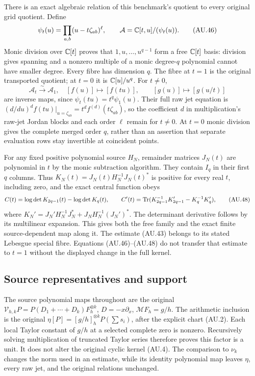 There is an exact algebraic relation of this benchmark's quotient to
every original grid quotient. Define
\[
 \psi_t(u)=\prod_{a,b}(u-t\zeta_{ab})^\ell,
 \qquad \mathcal A=\mathbb{C}[t,u]/(\psi_t(u)).                    \tag{AU.46}
\]
Monic division over $\mathbb{C}[t]$ proves that $1,u,\ldots,u^{q-1}$
form a free $\mathbb{C}[t]$ basis: division gives spanning and a nonzero
multiple of a monic degree-$q$ polynomial cannot have smaller degree.
Every fibre has dimension $q$. The fibre at $t=1$ is the original
transported quotient; at $t=0$ it is $\mathbb{C}[u]/u^q$. For $t\ne0$,
\[
 \mathcal A_t\xrightarrow{\sim}\mathcal A_1,
 \quad[f(u)]\longmapsto[f(tu)],\qquad
 [g(u)]\longmapsto[g(u/t)]                              \tag{AU.47}
\]
are inverse maps, since $\psi_t(tu)=t^q\psi_1(u)$.
Their full raw jet equation is
$(d/du)^d f(tu)|_{u=\zeta_{ab}}=t^df^{(d)}(t\zeta_{ab})$,
so the coefficient $d$ in multiplication's raw-jet Jordan blocks
and each order $\ell$ remain for $t\ne0$. At $t=0$ monic division
gives the complete merged order $q$, rather than an assertion that
separate evaluation rows stay invertible at coincident points.

For any fixed positive polynomial source $H_N$, remainder matrices
$J_N(t)$ are polynomial in $t$ by the monic subtraction algorithm.
They contain $I_q$ in their first $q$ columns. Thus
$K_N(t)=J_N(t)H_N^{-1}J_N(t)^*$ is positive for every real $t$,
including zero, and the exact central function obeys
\[
 C(t)=\log\det K_{2q-1}(t)-\log\det K_q(t),\qquad
 C'(t)=\operatorname{Tr}(K_{2q-1}^{-1}K_{2q-1}'-K_q^{-1}K_q'),
 \tag{AU.48}
\]
where $K_N'=J_N'H_N^{-1}J_N^*+J_NH_N^{-1}(J_N')^*$.
The determinant derivative follows by its multilinear expansion.
This gives both the free family and the exact finite source-dependent
map along it. The estimate (AU.43) belongs to its stated Lebesgue
special fibre. Equations (AU.46)--(AU.48) do not transfer that estimate
to $t=1$ without the displayed change in the full kernel.

\subsection{Source representatives and support}

The source polynomial maps throughout are the original
$\mathcal V_{h,k}P=P(D_1+\cdots+D_k)F_h^{\otimes k}$,
$D=-x\partial_x$, $\mathcal MF_h=g/h$.
The arithmetic inclusion is the original
$\eta[P]=[g/h]_h^{\otimes k}P(\sum s_i)$, after the explicit
chart (AU.2). Each local Taylor constant of $g/h$ at a selected
complete zero is nonzero. Recursively solving multiplication of
truncated Taylor series therefore proves this factor is a unit.
It does not alter the original cyclic kernel (AU.4).
The comparison to $\nu_k$ changes the norm used in an estimate,
while its identity polynomial map leaves $\eta$, every raw jet,
and the original relations unchanged.

